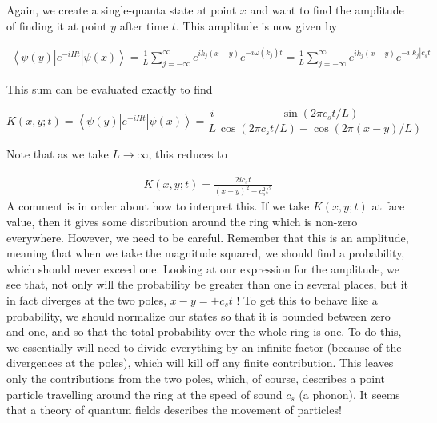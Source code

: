 \documentclass[pre,floatfix,onecolumn]{revtex4-2}
\begin{document}
Again, we create a single-quanta state at point $x$ and want to find the amplitude of finding it at point $y$ after time $t$. This amplitude is now given by

\begin{align}
\left\langle\psi(y)\left|e^{-i H t}\right| \psi(x)\right\rangle = \frac{1}{L} \sum_{j=-\infty}^{\infty} e^{i k_{j}(x-y)} e^{-i \omega\left(k_{j}\right) t} 
= \frac{1}{L} \sum_{j=-\infty}^{\infty} e^{i k_{j}(x-y)} e^{-i\left|k_{j}\right| c_{s} t}
\end{align}

This sum can be evaluated exactly to find

\begin{widetext}
    \begin{equation}
        \boxed{K(x, y ; t) = \left\langle\psi(y)\left|e^{-i H t}\right| \psi(x)\right\rangle 
= \frac{i}{L} \frac{\sin \left(2 \pi c_{s} t / L\right)}{\cos \left(2 \pi c_{s} t / L\right)-\cos (2 \pi(x-y) / L)}}
    \end{equation}
\end{widetext}

Note that as we take $L \rightarrow \infty$, this reduces to

\begin{align}
K(x, y ; t) = \frac{2 i c_{s} t}{(x-y)^{2}-c_{s}^{2} t^{2}}
\end{align}
A comment is in order about how to interpret this. If we take $K(x, y ; t)$ at face value, then it gives some distribution around the ring which is non-zero everywhere. However, we need to be careful. Remember that this is an amplitude, meaning that when we take the magnitude squared, we should find a probability, which should never exceed one. Looking at our expression for the amplitude, we see that, not only will the probability be greater than one in several places, but it in fact diverges at the two poles, $x-y= \pm c_{s} t$ ! To get this to behave like a probability, we should normalize our states so that it is bounded between zero and one, and so that the total probability over the whole ring is one. To do this, we essentially will need to divide everything by an infinite factor (because of the divergences at the poles), which will kill off any finite contribution. This leaves only the contributions from the two poles, which, of course, describes a point particle travelling around the ring at the speed of sound $c_{s}$ (a phonon). It seems that a theory of quantum fields describes the movement of particles!

\newpage
\end{document}
